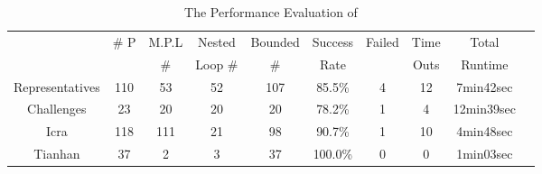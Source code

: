 \begin{table}[H]
 \vspace{-1cm}
    \caption{The Performance Evaluation of {\THESYSTEM}}
    \label{tb:performance-eval}
    \centering
        {\footnotesize
        \begin{tabular}{ >{\small}c | c | c | c | c | c | c | c | c | c }
            \multirow{2}{*}{Benchmarks} & \multirow{2}{*}{\# P}  & {M.P.L} & Nested  & {Bounded} & {Success} & \multirow{2}{*}{Failed} & Time  & Total\\
             &  & \# & Loop \# & \# & Rate &  & Outs &   Runtime \\
            \hline
                {Representatives} & {110}  & 53  & 52  & 107 & 85.5\% & 4 & 12 & 7min42sec \\
                \hline
                Challenges & 23  & 20 & 20 & {20} & {78.2\%}  & 1 & 4 & {12min39sec} \\
                \hline
                {Icra} & 118 & 111 & 21 & 98 & 90.7\% & 1 & 10 & {4min48sec} \\
                \hline
                Tianhan & 37 & 2 & 3 & 37 & 100.0\% & 0 & 0 & 1min03sec \\
                \hline
            \end{tabular}    
        }
 \vspace{-0.5cm}
    \end{table}